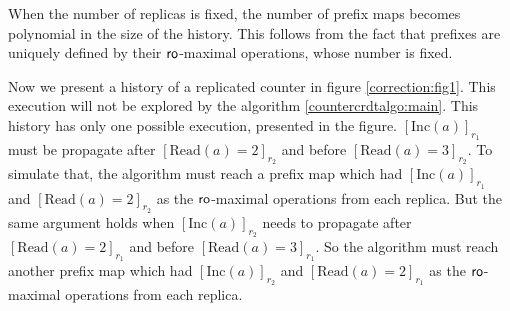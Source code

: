 When the number of replicas is fixed, the number of prefix maps becomes polynomial in the size of the history. This follows from the fact that prefixes are uniquely defined by their $\mathsf{ro}$-maximal operations, whose number is fixed.




Now we present a history of a replicated counter in figure \ref{correction:fig1}. This execution will not be explored by the algorithm \ref{countercrdtalgo:main}. This history has only one possible execution, presented in the figure. $[\mathrm{Inc}(a)]_{r_1}$ must be propagate after $[\mathrm{Read}(a) = 2]_{r_2}$ and before $[\mathrm{Read}(a) = 3]_{r_2}$. To simulate that, the algorithm must reach a prefix map which had $[\mathrm{Inc}(a)]_{r_1}$ and $[\mathrm{Read}(a) = 2]_{r_2}$ as the $\mathsf{ro}$-maximal operations from each replica. But the same argument holds when $[\mathrm{Inc}(a)]_{r_2}$ needs to propagate after $[\mathrm{Read}(a) = 2]_{r_1}$ and before $[\mathrm{Read}(a) = 3]_{r_1}$. So the algorithm must reach another prefix map which had $[\mathrm{Inc}(a)]_{r_2}$ and $[\mathrm{Read}(a) = 2]_{r_1}$ as the $\mathsf{ro}$-maximal operations from each replica. 


